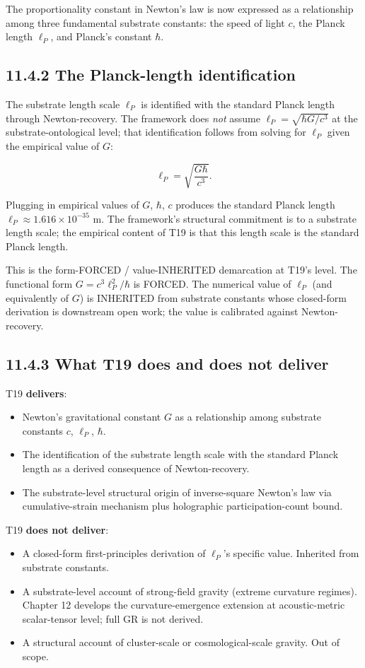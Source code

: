 \documentclass[11pt]{book}
\begin{document}
The proportionality constant in Newton's law is now expressed as a relationship among three fundamental substrate constants: the speed of light $c$, the Planck length $\ell_P$, and Planck's constant $\hbar$.

\subsection{11.4.2 The Planck-length identification}

The substrate length scale $\ell_P$ is identified with the standard Planck length through Newton-recovery. The framework does \textit{not} assume $\ell_P = \sqrt{\hbar G/c^3}$ at the substrate-ontological level; that identification follows from solving for $\ell_P$ given the empirical value of $G$:

\[
\ell_P = \sqrt{\frac{G\hbar}{c^3}}.
\]

Plugging in empirical values of $G$, $\hbar$, $c$ produces the standard Planck length $\ell_P \approx 1.616 \times 10^{-35}$ m. The framework's structural commitment is to a substrate length scale; the empirical content of T19 is that this length scale is the standard Planck length.

This is the form-FORCED / value-INHERITED demarcation at T19's level. The functional form $G = c^3\ell_P^2/\hbar$ is FORCED. The numerical value of $\ell_P$ (and equivalently of $G$) is INHERITED from substrate constants whose closed-form derivation is downstream open work; the value is calibrated against Newton-recovery.

\subsection{11.4.3 What T19 does and does not deliver}

T19 \textbf{delivers}:
\begin{itemize}
\item Newton's gravitational constant $G$ as a relationship among substrate constants $c$, $\ell_P$, $\hbar$.
\item The identification of the substrate length scale with the standard Planck length as a derived consequence of Newton-recovery.
\item The substrate-level structural origin of inverse-square Newton's law via cumulative-strain mechanism plus holographic participation-count bound.
\end{itemize}

T19 \textbf{does not deliver}:
\begin{itemize}
\item A closed-form first-principles derivation of $\ell_P$'s specific value. Inherited from substrate constants.
\item A substrate-level account of strong-field gravity (extreme curvature regimes). Chapter 12 develops the curvature-emergence extension at acoustic-metric scalar-tensor level; full GR is not derived.
\item A structural account of cluster-scale or cosmological-scale gravity. Out of scope.
\end{itemize}
\end{document}
